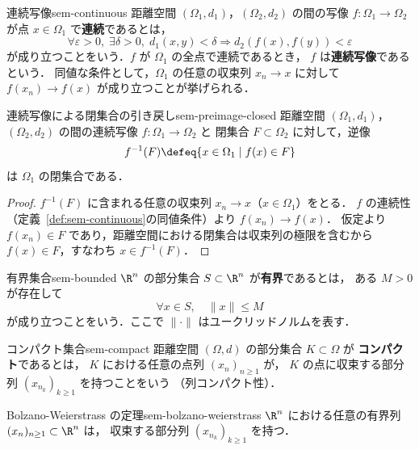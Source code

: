 \begin{definition}{連続写像}{sem-continuous}
  距離空間 $(\Omega_1, d_1)$，$(\Omega_2, d_2)$ の間の写像
  $f \colon \Omega_1 \to \Omega_2$ が点 $x \in \Omega_1$ で\textbf{連続}であるとは，
  \[
    \forall \varepsilon > 0,\; \exists \delta > 0,\;
    d_1(x, y) < \delta \Longrightarrow d_2(f(x), f(y)) < \varepsilon
  \]
  が成り立つことをいう．$f$ が $\Omega_1$ の全点で連続であるとき，
  $f$ は\textbf{連続写像}であるという．
  同値な条件として，$\Omega_1$ の任意の収束列 $x_n \to x$ に対して
  $f(x_n) \to f(x)$ が成り立つことが挙げられる．
\end{definition}

\begin{proposition}{連続写像による閉集合の引き戻し}{sem-preimage-closed}
  距離空間 $(\Omega_1, d_1)$，$(\Omega_2, d_2)$ の間の連続写像 $f \colon \Omega_1 \to \Omega_2$ と
  閉集合 $F \subset \Omega_2$ に対して，逆像
  \[
    f^{-1}(F) \defeq \{ x \in \Omega_1 \mid f(x) \in F \}
  \]
  は $\Omega_1$ の閉集合である．
\end{proposition}
\begin{proof}
  $f^{-1}(F)$ に含まれる任意の収束列 $x_n \to x$（$x \in \Omega_1$）をとる．
  $f$ の連続性（定義~\ref{def:sem-continuous}の同値条件）より $f(x_n) \to f(x)$．
  仮定より $f(x_n) \in F$ であり，距離空間における閉集合は収束列の極限を含むから
  $f(x) \in F$，すなわち $x \in f^{-1}(F)$．
\end{proof}

\begin{definition}{有界集合}{sem-bounded}
  $\R^n$ の部分集合 $S \subset \R^n$ が\textbf{有界}であるとは，
  ある $M > 0$ が存在して
  \[
    \forall x \in S,\quad \|x\| \leq M
  \]
  が成り立つことをいう．ここで $\|\cdot\|$ はユークリッドノルムを表す．
\end{definition}

\begin{definition}{コンパクト集合}{sem-compact}
  距離空間 $(\Omega, d)$ の部分集合 $K \subset \Omega$ が
  \textbf{コンパクト}であるとは，
  $K$ における任意の点列 $(x_n)_{n \geq 1}$ が，
  $K$ の点に収束する部分列 $(x_{n_k})_{k \geq 1}$ を持つことをいう
  （列コンパクト性）．
\end{definition}

\begin{claim}{Bolzano-Weierstrass の定理}{sem-bolzano-weierstrass}
  $\R^n$ における任意の有界列 $(x_n)_{n \geq 1} \subset \R^n$ は，
  収束する部分列 $(x_{n_k})_{k \geq 1}$ を持つ．
\end{claim}

